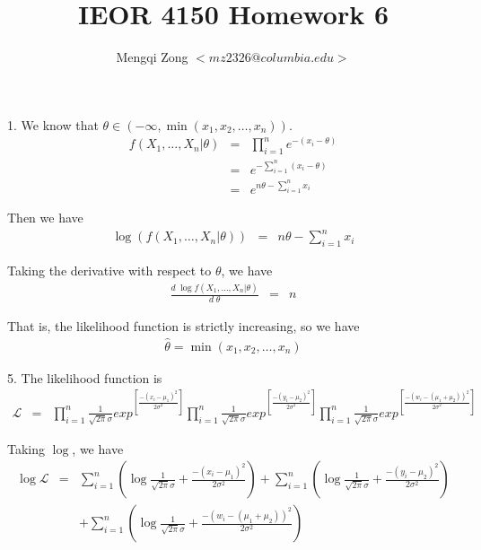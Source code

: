 \documentclass[12pt]{article}
\title{IEOR 4150 Homework 6}
\author{Mengqi Zong $<mz2326@columbia.edu>$}
\begin{document}
\maketitle

\setlength{\parindent}{0in}

1. We know that $\theta \in (-\infty, \min (x_1, x_2, \dots, x_n))$.
\begin{eqnarray*}
  f(X_1, \dots, X_n | \theta)
  &=& \prod_{i=1}^n e^{-(x_i - \theta)} \\
  &=& e^{- \sum_{i=1}^n (x_i - \theta)} \\
  &=& e^{n \theta - \sum_{i=1}^n x_i}
\end{eqnarray*}

Then we have
\begin{eqnarray*}
  \log {\left( f(X_1, \dots, X_n | \theta) \right)}
  &=& n \theta - \sum_{i=1}^n x_i
\end{eqnarray*}

Taking the derivative with respect to $\theta$, we have
\begin{eqnarray*}
  \frac {d \; \log f(X_1, \dots, X_n | \theta)}{d \; \theta}
  &=& n
\end{eqnarray*}

That is, the likelihood function is strictly increasing, so we have
\begin{eqnarray*}
  \hat{\theta} = \min (x_1, x_2, \dots, x_n)
\end{eqnarray*}

5. The likelihood function is
\begin{eqnarray*}
  \mathcal{L}
  &=& \prod_{i=1}^n \frac {1}{\sqrt{2\pi} \sigma}
  exp^{\left[ \frac{-(x_i - \mu_1)^2}{2\sigma^2} \right]}
  \prod_{i=1}^n \frac {1}{\sqrt{2\pi} \sigma}
  exp^{\left[ \frac{-(y_i - \mu_2)^2}{2\sigma^2} \right]}
  \prod_{i=1}^n \frac {1}{\sqrt{2\pi} \sigma}
  exp^{\left[ \frac{-(w_i - (\mu_1+\mu_2))^2}{2\sigma^2} \right]}
\end{eqnarray*}

Taking $\log$, we have
\begin{eqnarray*}
  \log {\mathcal{L}}
  &=& \sum_{i=1}^n \left( \log {\frac {1}{\sqrt{2\pi} \sigma}} +
    \frac{-(x_i - \mu_1)^2}{2\sigma^2} \right) +
  \sum_{i=1}^n \left( \log {\frac {1}{\sqrt{2\pi} \sigma}} +
    \frac{-(y_i - \mu_2)^2}{2\sigma^2} \right) \\
  && + \sum_{i=1}^n \left( \log {\frac {1}{\sqrt{2\pi} \sigma}} +
    \frac{-(w_i - (\mu_1+\mu_2))^2}{2\sigma^2} \right)
\end{eqnarray*}
\end{document}
